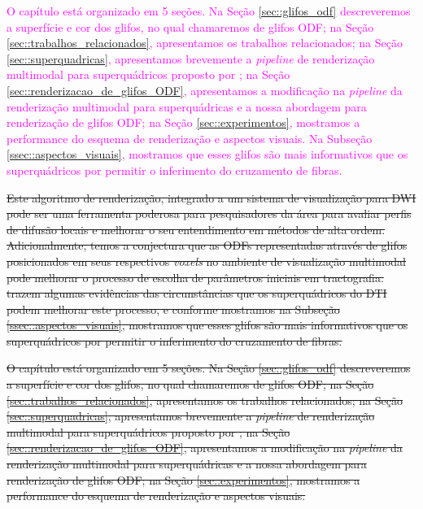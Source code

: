 \textcolor{magenta}{O capítulo está organizado em 5 seções. Na Seção \ref{sec::glifos_odf} descreveremos a superfície e cor dos glifos, no qual chamaremos de glifos ODF; na Seção \ref{sec::trabalhos_relacionados}, apresentamos os trabalhos relacionados; na Seção \ref{sec::superquadricas}, apresentamos brevemente a \textit{pipeline} de renderização multimodal para superquádricos proposto por ; na Seção \ref{sec::renderizacao_de_glifos_ODF}, apresentamos a modificação na \textit{pipeline} da renderização multimodal para superquádricas e a nossa abordagem para renderização de glifos ODF; na Seção \ref{sec::experimentos}, mostramos a performance do esquema de renderização e aspectos visuais.
}
\textcolor{magenta}{
Na Subseção \ref{ssec::aspectos_visuais}, mostramos que esses glifos são mais informativos que os superquádricos por permitir o inferimento do cruzamento de fibras.
}

\sout{Este algoritmo de renderização, integrado a um sistema de visualização para DWI pode ser uma ferramenta poderosa para pesquisadores da área para avaliar perfis de difusão locais e melhorar o seu entendimento em métodos de alta ordem.
Adicionalmente, temos a conjectura que as ODFs representadas através de glifos posicionados em seus respectivos \textit{voxels} no ambiente de visualização multimodal pode melhorar o processo de escolha de parâmetros iniciais em tractografia.  trazem algumas evidências das circunstâncias que os superquádricos do DTI podem melhorar este processo, e conforme mostramos na Subseção \ref{ssec::aspectos_visuais}, mostramos que esses glifos são mais informativos que os superquádricos por permitir o inferimento do cruzamento de fibras.
}

\sout{O capítulo está organizado em 5 seções. Na Seção \ref{sec::glifos_odf} descreveremos a superfície e cor dos glifos, no qual chamaremos de glifos ODF; na Seção \ref{sec::trabalhos_relacionados}, apresentamos os trabalhos relacionados; na Seção \ref{sec::superquadricas}, apresentamos brevemente a \textit{pipeline} de renderização multimodal para superquádricos proposto por ; na Seção \ref{sec::renderizacao_de_glifos_ODF}, apresentamos a modificação na \textit{pipeline} da renderização multimodal para superquádricas e a nossa abordagem para renderização de glifos ODF; na Seção \ref{sec::experimentos}, mostramos a performance do esquema de renderização e aspectos visuais.}



